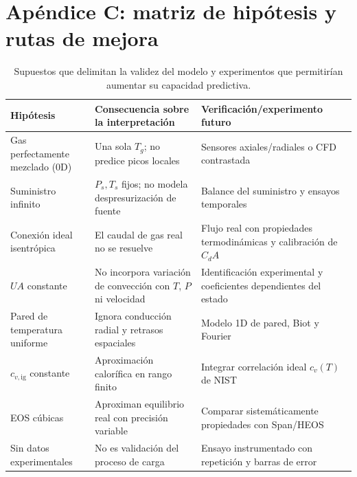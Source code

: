 \documentclass[11pt,letterpaper]{article}
\begin{document}
\section{Apéndice C: matriz de hipótesis y rutas de mejora}
\begin{table}[H]\centering\footnotesize
\begin{tabularx}{\linewidth}{p{35mm}X X}\toprule
Hipótesis & Consecuencia sobre la interpretación & Verificación/experimento futuro \\\midrule
Gas perfectamente mezclado (0D) & Una sola $T_g$; no predice picos locales & Sensores axiales/radiales o CFD contrastada \\
Suministro infinito & $P_s,T_s$ fijos; no modela despresurización de fuente & Balance del suministro y ensayos temporales \\
Conexión ideal isentrópica & El caudal de gas real no se resuelve & Flujo real con propiedades termodinámicas y calibración de $C_dA$ \\
$UA$ constante & No incorpora variación de convección con $T$, $P$ ni velocidad & Identificación experimental y coeficientes dependientes del estado \\
Pared de temperatura uniforme & Ignora conducción radial y retrasos espaciales & Modelo 1D de pared, Biot y Fourier \\
$c_{v,\mathrm{ig}}$ constante & Aproximación calorífica en rango finito & Integrar correlación ideal $c_v(T)$ de NIST \\
EOS cúbicas & Aproximan equilibrio real con precisión variable & Comparar sistemáticamente propiedades con Span/HEOS \\
Sin datos experimentales & No es validación del proceso de carga & Ensayo instrumentado con repetición y barras de error \\\bottomrule
\end{tabularx}
\caption{Supuestos que delimitan la validez del modelo y experimentos que permitirían aumentar su capacidad predictiva.}
\end{table}
\end{document}
